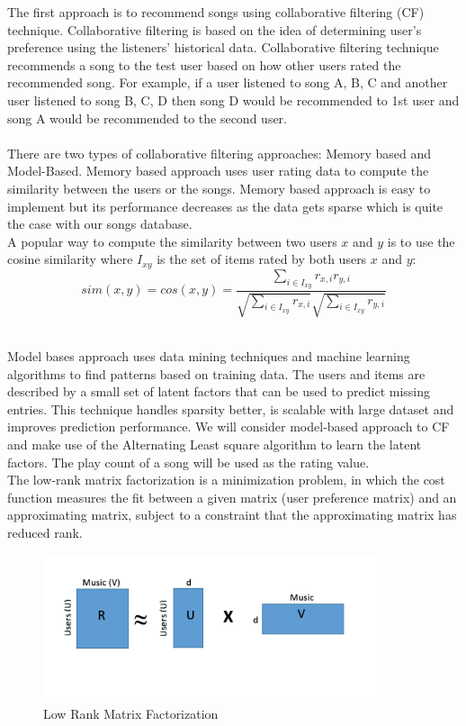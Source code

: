 \documentclass{sig-alternate-05-2015}
\begin{document}
The first approach is to recommend songs using collaborative filtering (CF) technique. Collaborative filtering is based on the idea of determining user's preference using the listeners' historical data. Collaborative filtering technique recommends a song to the test user based on how other users rated the recommended song. For example, if a user listened to song A, B, C and another user listened to song B, C, D then song D would be recommended to 1st user and song A would be recommended to the second user. \\\\
There are two types of collaborative filtering approaches:  Memory based and Model-Based. Memory based approach uses user rating data to compute the similarity between the users or the songs. Memory based approach is easy to implement but its performance decreases as the data gets sparse which is quite the case with our songs database. \\
A popular way to compute the similarity between two users $x$ and $y$ is to use the cosine similarity where $I_{xy}$ is the set of items rated by both users $x$ and $y$:
\begin{equation*}
    sim(x, y) = cos(x, y) = \frac{\sum_{i \in I_{xy}}^{} r_{x,i} r_{y,i}}{\sqrt{\sum_{i \in I_{xy}}^{} r_{x,i}}\sqrt{\sum_{i \in I_{xy}}^{} r_{y,i}}}
\end{equation*}

\\
Model bases approach uses data mining techniques and machine learning algorithms to find patterns based on training data. The users and items are described by a small set of latent factors that can be used to predict missing entries. This technique handles sparsity better, is scalable with large dataset and improves prediction performance. We will consider model-based approach to CF and make use of the Alternating Least square algorithm to learn the latent factors. The play count of a song will be used as the rating value.\\

The low-rank matrix factorization is a minimization problem, in which the cost function measures the fit between a given matrix (user preference matrix) and an approximating matrix, subject to a constraint that the approximating matrix has reduced rank.
\begin{figure}[h]
    \centering
    \includegraphics [width =10cm]{Images/LRMFactorization.png}
    \caption{Low Rank Matrix Factorization}
\end{figure}
\end{document}
